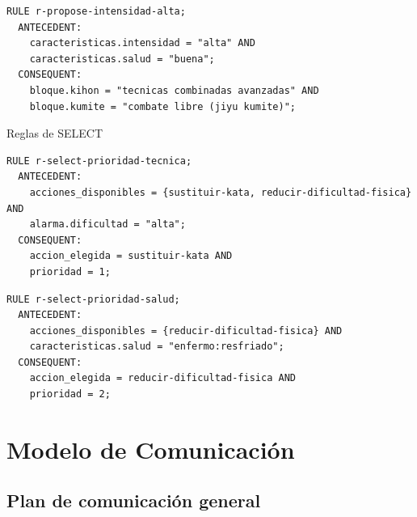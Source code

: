 \documentclass[12pt,a4paper,twoside,spanish]{article}      %
\begin{document}
\begin{verbatim}
RULE r-propose-intensidad-alta;
  ANTECEDENT:
    caracteristicas.intensidad = "alta" AND
    caracteristicas.salud = "buena";
  CONSEQUENT:
    bloque.kihon = "tecnicas combinadas avanzadas" AND
    bloque.kumite = "combate libre (jiyu kumite)";
\end{verbatim}
Reglas de SELECT
\begin{verbatim}
RULE r-select-prioridad-tecnica;
  ANTECEDENT:
    acciones_disponibles = {sustituir-kata, reducir-dificultad-fisica} AND
    alarma.dificultad = "alta";
  CONSEQUENT:
    accion_elegida = sustituir-kata AND
    prioridad = 1;
\end{verbatim}

\begin{verbatim}
RULE r-select-prioridad-salud;
  ANTECEDENT:
    acciones_disponibles = {reducir-dificultad-fisica} AND
    caracteristicas.salud = "enfermo:resfriado";
  CONSEQUENT:
    accion_elegida = reducir-dificultad-fisica AND
    prioridad = 2;
\end{verbatim}

\section{Modelo de Comunicación}


\subsection{Plan de comunicación general}
\end{document}
